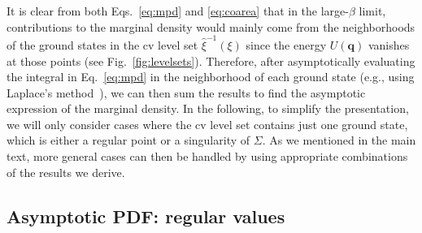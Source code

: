 It is clear from both Eqs.~\eqref{eq:mpd} and \eqref{eq:coarea} that in the large-$\beta$ limit, contributions to the marginal density would mainly come from the neighborhoods of the ground states in the \ac{cv} level set $\hat{\xi}^{-1}(\xi)$ since the energy $U(\bm{q})$ vanishes at those points (see Fig.~\ref{fig:levelsets}).
Therefore, after asymptotically evaluating the integral in Eq.~\eqref{eq:mpd} in the neighborhood of each ground state (e.g., using Laplace's method~\cite{breitung1994}), we can then sum the results to find the asymptotic expression of the marginal density.
In the following, to simplify the presentation, we will only consider cases where the \ac{cv} level set contains just one ground state, which is either a regular point or a singularity of $\Sigma$.
As we mentioned in the main text, more general cases can then be handled by using appropriate combinations of the results we derive.

\subsection{Asymptotic PDF: regular values}
\label{sec:regular}

